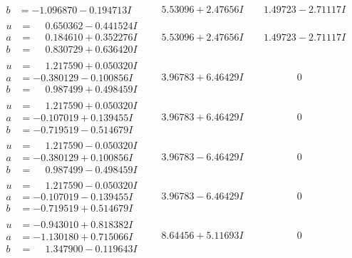 \documentclass[1p]{elsarticle_modified}
\theoremstyle{definition}
\begin{document}
$$\begin{array}{c|c|c}
\begin{aligned}
b &= -1.096870 - 0.194713 I\end{aligned}
 & \phantom{-}5.53096 + 2.47656 I & \phantom{-}1.49723 - 2.71117 I \\ \hline\begin{aligned}
u &= \phantom{-}0.650362 - 0.441524 I \\
a &= \phantom{-}0.184610 + 0.352276 I \\
b &= \phantom{-}0.830729 + 0.636420 I\end{aligned}
 & \phantom{-}5.53096 + 2.47656 I & \phantom{-}1.49723 - 2.71117 I \\ \hline\begin{aligned}
u &= \phantom{-}1.217590 + 0.050320 I \\
a &= -0.380129 - 0.100856 I \\
b &= \phantom{-}0.987499 + 0.498459 I\end{aligned}
 & \phantom{-}3.96783 + 6.46429 I & \phantom{-0.000000 } 0 \\ \hline\begin{aligned}
u &= \phantom{-}1.217590 + 0.050320 I \\
a &= -0.107019 + 0.139455 I \\
b &= -0.719519 - 0.514679 I\end{aligned}
 & \phantom{-}3.96783 + 6.46429 I & \phantom{-0.000000 } 0 \\ \hline\begin{aligned}
u &= \phantom{-}1.217590 - 0.050320 I \\
a &= -0.380129 + 0.100856 I \\
b &= \phantom{-}0.987499 - 0.498459 I\end{aligned}
 & \phantom{-}3.96783 - 6.46429 I & \phantom{-0.000000 } 0 \\ \hline\begin{aligned}
u &= \phantom{-}1.217590 - 0.050320 I \\
a &= -0.107019 - 0.139455 I \\
b &= -0.719519 + 0.514679 I\end{aligned}
 & \phantom{-}3.96783 - 6.46429 I & \phantom{-0.000000 } 0 \\ \hline\begin{aligned}
u &= -0.943010 + 0.818382 I \\
a &= -1.130180 + 0.715066 I \\
b &= \phantom{-}1.347900 - 0.119643 I\end{aligned}
 & \phantom{-}8.64456 + 5.11693 I & \phantom{-0.000000 } 0 \\ \hline\begin{aligned}

\end{aligned}
\end{array}$$
\end{document}
